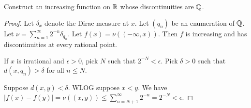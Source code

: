 \documentclass{article}
\begin{document}
 
 Construct an increasing function on $\mathbb{R}$ whose discontinuities are $\mathbb{Q}$.

\begin{proof}
Let $\delta_x$ denote the Dirac measure at $x$. Let $(q_n)$ be an enumeration of $\mathbb{Q}$.  Let $\nu = \sum_{n=1}^\infty 2^{-n} \delta_{q_n}$. Let 
$f(x) = \nu((-\infty, x))$. Then $f$ is increasing and has discontinuities at every rational point. 

 If $x$ is irrational and $\epsilon > 0$, pick $N$ such that $2^{-N} < \epsilon$.  
Pick $\delta > 0$ such that $d(x,q_n) > \delta$ for all $n \le N$.  

Suppose $d(x,y) < \delta$.  WLOG suppose $x < y$. We have $|f(x) - f(y)| = \nu((x,y)) \le \sum_{n = N + 1}^\infty 2^{-n} = 2^{-N} < \epsilon$.
\end{proof}
\end{document}
